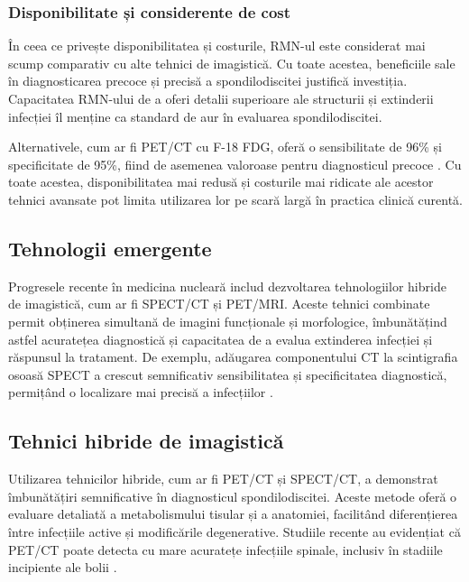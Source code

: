 \documentclass[romanian,12pt,a4paper]{article}
\begin{document}
\subsubsection{Disponibilitate și considerente de cost}

În ceea ce privește disponibilitatea și costurile, RMN-ul este
considerat mai scump comparativ cu alte tehnici de imagistică. Cu toate
acestea, beneficiile sale în diagnosticarea precoce și precisă a
spondilodiscitei justifică investiția. Capacitatea RMN-ului de a oferi
detalii superioare ale structurii și extinderii infecției îl menține ca
standard de aur în evaluarea spondilodiscitei.

Alternativele, cum ar fi PET/CT cu F-18 FDG, oferă o sensibilitate de
96\% și specificitate de 95\%, fiind de asemenea valoroase pentru
diagnosticul precoce \cite{ComparisonDiagnosticValue2017}. Cu toate
acestea, disponibilitatea mai redusă și costurile mai ridicate ale
acestor tehnici avansate pot limita utilizarea lor pe scară largă în
practica clinică curentă.

\subsection{Tehnologii emergente}

Progresele recente în medicina nucleară includ dezvoltarea tehnologiilor
hibride de imagistică, cum ar fi SPECT/CT și PET/MRI. Aceste tehnici
combinate permit obținerea simultană de imagini funcționale și
morfologice, îmbunătățind astfel acuratețea diagnostică și capacitatea
de a evalua extinderea infecției și răspunsul la tratament. De exemplu,
adăugarea componentului CT la scintigrafia osoasă SPECT a crescut
semnificativ sensibilitatea și specificitatea diagnostică, permițând o
localizare mai precisă a infecțiilor
\cite{RadionuclideImagingMusculoskeletal2016}\cite{RoleNuclearMedicine2012}.

\subsection{Tehnici hibride de imagistică}

Utilizarea tehnicilor hibride, cum ar fi PET/CT și SPECT/CT, a
demonstrat îmbunătățiri semnificative în diagnosticul spondilodiscitei.
Aceste metode oferă o evaluare detaliată a metabolismului tisular și a
anatomiei, facilitând diferențierea între infecțiile active și
modificările degenerative. Studiile recente au evidențiat că PET/CT
poate detecta cu mare acuratețe infecțiile spinale, inclusiv în stadiile
incipiente ale bolii
\cite{RadionuclideImagingMusculoskeletal2016}\cite{ImagingAssessmentSpine2024}.
\pagebreak
\end{document}
